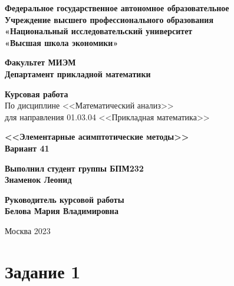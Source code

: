 \documentclass[a4paper, 14pt]{extarticle}
\begin{document}
\begin{titlepage}
    \newpage
    \begin{center}
    {\bfseries 	Федеральное государственное автономное образовательное \\
				Учреждение высшего профессионального образования \\
				«Национальный исследовательский университет \\
				«Высшая школа экономики»}
    \vspace{1cm}
    
    {\bfseries  Факультет МИЭМ \\
				Департамент прикладной математики}
    
    \vspace{1cm}

    {\bfseries{\Large Курсовая работа}} \\
    По дисциплине <<Математический анализ>> \\
    для направления 01.03.04 <<Прикладная математика>>
    
    \vspace{1cm}
    
    {\bfseries{\large 	<<Элементарные асимптотические методы>>} \\
    					Вариант 41}
    
	\end{center}
	
	\vspace{\fill}
	
	\begin{flushright}
	{\bfseries	{\large Выполнил студент группы БПМ232} \\
						Знаменок Леонид}
	
	\vspace{1cm}					
	{\bfseries	{\large Руководитель курсовой работы} \\
			  			Белова Мария Владимировна}
	\end{flushright}
	
	\vspace{1cm}
    \begin{center}
    Москва 2023
    \end{center}

\end{titlepage}



\section{Задание 1}
\end{document}
